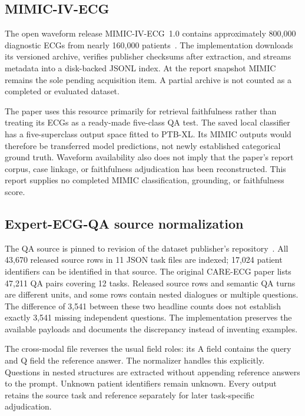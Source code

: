 \documentclass[11pt,a4paper]{article}
\newcommand{\code}[1]{\texttt{\detokenize{#1}}}
\begin{document}
\subsection{MIMIC-IV-ECG}
The open waveform release MIMIC-IV-ECG~1.0 contains approximately 800,000 diagnostic ECGs from nearly 160,000 patients~\cite{mimic}. The implementation downloads its versioned archive, verifies publisher checksums after extraction, and streams metadata into a disk-backed JSONL index. At the report snapshot MIMIC remains the sole pending acquisition item. A partial archive is not counted as a completed or evaluated dataset.

The paper uses this resource primarily for retrieval faithfulness rather than treating its ECGs as a ready-made five-class QA test. The saved local classifier has a five-superclass output space fitted to PTB-XL. Its MIMIC outputs would therefore be transferred model predictions, not newly established categorical ground truth. Waveform availability also does not imply that the paper's report corpus, case linkage, or faithfulness adjudication has been reconstructed. This report supplies no completed MIMIC classification, grounding, or faithfulness score.

\subsection{Expert-ECG-QA source normalization}
The QA source is pinned to revision \code{4fcb46974eed422532772caa483a5e621f006ff1} of the dataset publisher's repository~\cite{qa_repo,qa}. All 43,670 released source rows in 11 JSON task files are indexed; 17,024 patient identifiers can be identified in that source. The original CARE-ECG paper lists 47,211 QA pairs covering 12 tasks. Released source rows and semantic QA turns are different units, and some rows contain nested dialogues or multiple questions. The difference of 3,541 between these two headline counts does not establish exactly 3,541 missing independent questions. The implementation preserves the available payloads and documents the discrepancy instead of inventing examples.

\begin{table}[htbp]\centering\small

\caption{Complete released QA source-row inventory for the pinned revision. These are acquisition counts, not successfully answered or scored questions.}
\label{tab:qa}\end{table}

The cross-modal file reverses the usual field roles: its A field contains the query and Q field the reference answer. The normalizer handles this explicitly. Questions in nested structures are extracted without appending reference answers to the prompt. Unknown patient identifiers remain unknown. Every output retains the source task and reference separately for later task-specific adjudication.
\end{document}

